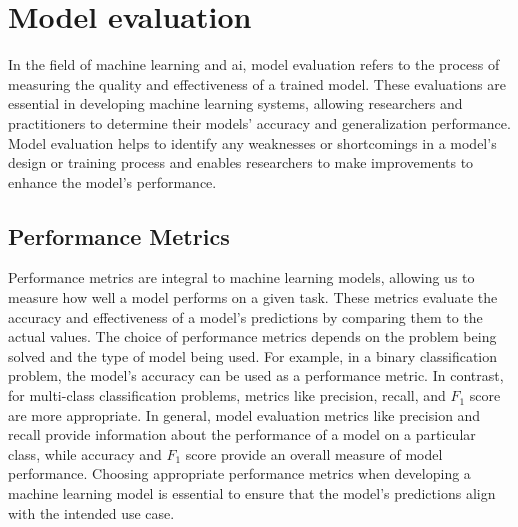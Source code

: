     







    




\section{Model evaluation}
    In the field of machine learning and \gls{ai}, model evaluation refers to the process of measuring the quality and effectiveness of a trained model. These evaluations are essential in developing machine learning systems, allowing researchers and practitioners to determine their models' accuracy and generalization performance. Model evaluation helps to identify any weaknesses or shortcomings in a model's design or training process and enables researchers to make improvements to enhance the model's performance.

    \subsection*{Performance Metrics}
    \label{sec2:performance_metrics}
    Performance metrics are integral to machine learning models, allowing us to measure how well a model performs on a given task. These metrics evaluate the accuracy and effectiveness of a model's predictions by comparing them to the actual values. The choice of performance metrics depends on the problem being solved and the type of model being used. For example, in a binary classification problem, the model's accuracy can be used as a performance metric. In contrast, for multi-class classification problems, metrics like precision, recall, and $F_1$ score are more appropriate. In general, model evaluation metrics like precision and recall provide information about the performance of a model on a particular class, while accuracy and $F_1$ score provide an overall measure of model performance. Choosing appropriate performance metrics when developing a machine learning model is essential to ensure that the model's predictions align with the intended use case.
    
